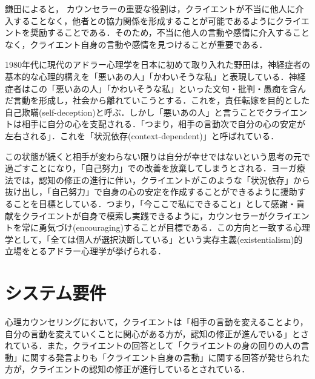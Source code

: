 \documentclass[shuuron]{kuee}
\begin{document}
鎌田\cite{kamata2002}によると， カウンセラーの重要な役割は，クライエントが不当に他人に介入することなく，他者との協力関係を形成することが可能であるようにクライエントを奨励することである．そのため，不当に他人の言動や感情に介入することなく，クライエント自身の言動や感情を見つけることが重要である．

1980年代に現代のアドラー心理学を日本に初めて取り入れた野田\cite{zokad}は，神経症者の基本的な心理的構えを「悪いあの人」「かわいそうな私」と表現している．神経症者はこの「悪いあの人」「かわいそうな私」といった文句・批判・愚痴を含んだ言動を形成し，社会から離れていこうとする．これを，責任転嫁を目的とした自己欺瞞(self-deception)と呼ぶ\cite{Darshana}．しかし「悪いあの人」と言うことでクライエントは相手に自分の心を支配される．「つまり，相手の言動次で自分の心の安定が左右される」．これを「状況依存(context-dependent)」と呼ばれている．

この状態が続くと相手が変わらない限りは自分が幸せではないという思考の元で過ごすことになり，「自己努力」での改善を放棄してしまうとされる\cite{zokad}．ヨーガ療法では，認知の修正の進行に伴い，クライエントがこのような「状況依存」から抜け出し，「自己努力」で自身の心の安定を作成することができるように援助することを目標としている．つまり，「今ここで私にできること」として感謝・貢献をクライエントが自身で模索し実践できるように，カウンセラーがクライエントを常に勇気づけ(encouraging)することが目標である．この方向と一致する心理学として，「全ては個人が選択決断している」という実存主義(existentialism)的立場をとるアドラー心理学が挙げられる．


\section{システム要件}
心理カウンセリングにおいて，クライエントは「相手の言動を変えることより，自分の言動を変えていくことに関心がある方が，認知の修正が進んでいる」\cite{zokad}とされている．また，クライエントの回答として「クライエントの身の回りの人の言動」に関する発言よりも「クライエント自身の言動」に関する回答が発せられた方が，クライエントの認知の修正が進行しているとされている．
\end{document}
